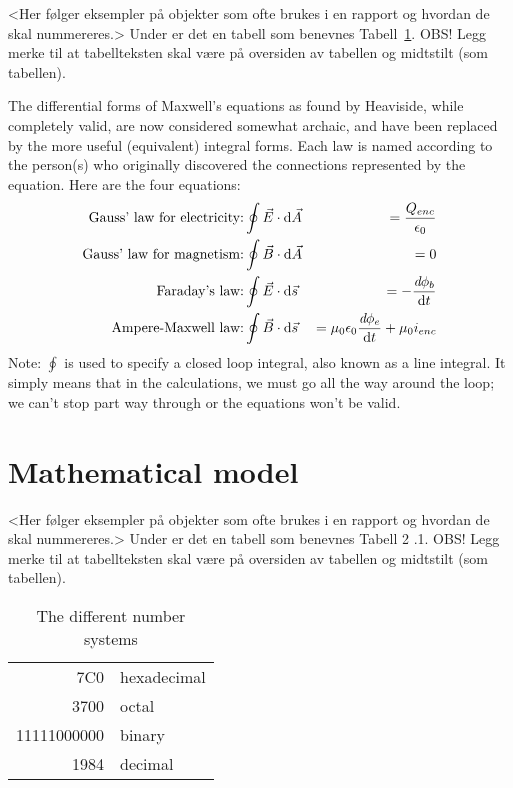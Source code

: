 \documentclass[%
    norsk,  %
]{USN-BSc}
\begin{document}
<Her følger eksempler på objekter som ofte brukes i en rapport og hvordan de skal nummereres.>
Under er det en tabell som benevnes Tabell~\ref{tab:number}. OBS! Legg merke til at tabellteksten skal være på oversiden av tabellen og midtstilt (som tabellen).

\indent The differential forms of Maxwell's equations as found by Heaviside, while completely valid, are now considered somewhat archaic, and have been replaced by the more useful (equivalent) integral forms. Each law is named according to the person(s) who originally discovered the connections represented by the equation. Here are the four equations:
\begin{eqnarray}
  \text{Gauss' law for electricity:}& \displaystyle \oint{\vec{E}\cdot\mathrm{d}\vec{A}}&=\frac{Q_{enc}}{\epsilon_0}\\
  \text{Gauss' law for magnetism:}& \displaystyle \oint{\vec{B}\cdot\mathrm{d}\vec{A}}&=0\\
  \text{Faraday's law:}& \displaystyle\oint{\vec{E}\cdot\mathrm{d}\vec{s}}&=-\frac{\emph{d}\phi_b}{\mathrm{d}t}\\
  \text{Ampere-Maxwell law:}& \displaystyle\oint{\vec{B}\cdot\mathrm{d}\vec{s}}&=\mu_0\epsilon_0\frac{\emph{d}\phi_e}{\mathrm{d}t}+\mu_0 i_{enc}
\end{eqnarray}
Note: $\oint$ is used to specify a closed loop integral, also known as a line integral. It simply means that in the calculations, we must go all the way around the loop; we can't stop part way through or the equations won't be valid.



\section{Mathematical model}
\label{sec:mathmodel}

<Her følger eksempler på objekter som ofte brukes i en rapport og hvordan de skal nummereres.>
Under er det en tabell som benevnes Tabell  2 .1. OBS! Legg merke til at tabellteksten skal være på oversiden av tabellen og midtstilt (som tabellen).

\lipsum[8]
\begin{table}[!ht]
  \caption{The different number systems}
  \label{tab:number}
  \centering
  \begin{tabular}{|r|l|}
    \hline
    7C0 & hexadecimal \\
    3700 & octal \\ \cline{2-2}
    11111000000 & binary \\
    \hline \hline
    1984 & decimal \\
    \hline
  \end{tabular}
\end{table}
\end{document}
